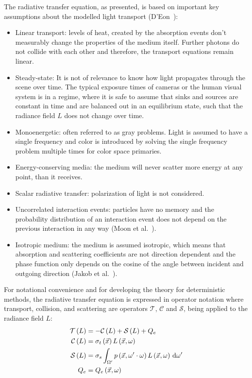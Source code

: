 The radiative transfer equation, as presented, is based on important key assumptions about the modelled light transport (D'Eon~\cite{DEon14}):
\begin{itemize}
\item Linear transport: levels of heat, created by the absorption events don't measurably change the properties of the medium itself. Further photons do not collide with each other and therefore, the transport equations remain linear.
\item Steady-state: It is not of relevance to know how light propagates through the scene over time. The typical exposure times of cameras or the human visual system is in a regime, where it is safe to assume that sinks and sources are constant in time and are balanced out in an equilibrium state, such that the radiance field $L$ does not change over time.
\item Monoenergetic: often referred to as gray problems. Light is assumed to have a single frequency and color is introduced by solving the single frequency problem multiple times for color space primaries.
\item Energy-conserving media: the medium will never scatter more energy at any point, than it receives.
\item Scalar radiative transfer: polarization of light is not considered.
\item Uncorrelated interaction events: particles have no memory and the probability distribution of an interaction event does not depend on the previous interaction in any way (Moon et al.~\cite{Moon07}).
\item Isotropic medium: the medium is assumed isotropic, which means that absorption and scattering coefficients are not direction dependent and the phase function only depends on the cosine of the angle between incident and outgoing direction (Jakob et al.~\cite{Jakob10}).
\end{itemize}

For notational convenience and for developing the theory for deterministic methods, the radiative transfer equation is expressed in operator notation where transport, collision, and scattering are operators $\mathcal{T}$, $\mathcal{C}$ and $\mathcal{S}$, being applied to the radiance field $L$:
\begin{align}
\mathcal{T}\left(L\right) &= -\mathcal{C}\left(L\right) + \mathcal{S}\left(L\right) + Q_e
\label{eq:rte_operator_notation}
\\
\mathcal{C}\left(L\right) &= \sigma_t\left(\vec{x}\right) L\left(\vec{x}, \omega \right)
\nonumber
\\
\mathcal{S}\left(L\right) &= \sigma_s \int_{\Omega'}p\left(\vec{x}, \omega'\cdot\omega\right)L\left(\vec{x}, \omega \right)\,\mathrm{d}\omega'
\nonumber
\\
Q_e &= Q_e\left(\vec{x}, \omega\right)
\nonumber
\end{align}


